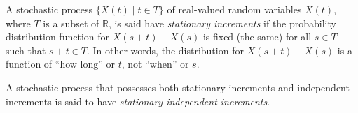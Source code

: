 \documentclass[12pt]{article}
\begin{document}
A stochastic process $\lbrace X(t)\mid t\in T\rbrace$ of real-valued
random variables $X(t)$, where $T$ is a subset of $\mathbb{R}$, is
said have \emph{stationary increments} if the probability
distribution function for $X(s+t)-X(s)$ is fixed (the same) for all
$s\in T$ such that $s+t\in T$.  In other words, the distribution for $X(s+t)-X(s)$ is a function of ``how long'' or $t$, not ``when'' or $s$.

A stochastic process that possesses both stationary increments and
independent increments is said to have \emph{stationary independent
increments}.
\end{document}
